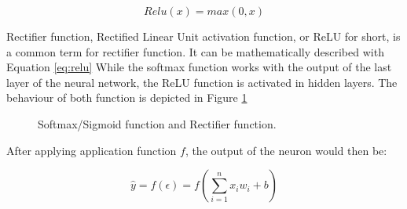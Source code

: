 \begin{equation}
	Relu(x) = max(0, x)
	\label{eq:relu}
\end{equation}

Rectifier function, Rectified Linear Unit activation function, or ReLU for short, is a common term for rectifier function. It can be mathematically described with Equation \ref{eq:relu}\newline
While the softmax function works with the output of the last layer of the neural network, the ReLU function is activated in hidden layers. The behaviour of both function is depicted in Figure \ref{fig:foftmaxrelu} 
\begin{figure}[h]
	\centering
	\begin{minipage}{.5\textwidth}
		\centering
	\end{minipage}%
	\begin{minipage}{.5\textwidth}
		\centering
		
	\end{minipage}
	\caption{Softmax/Sigmoid function and Rectifier function.}
	\label{fig:foftmaxrelu}
\end{figure}

After applying application function $f$, the output of the neuron would then be: 

\begin{equation}
	\hat{y} = f (\epsilon) = f (\sum_{i=1}^{n} x_i w_i + b)
	\label{eq:forpass}
\end{equation}

